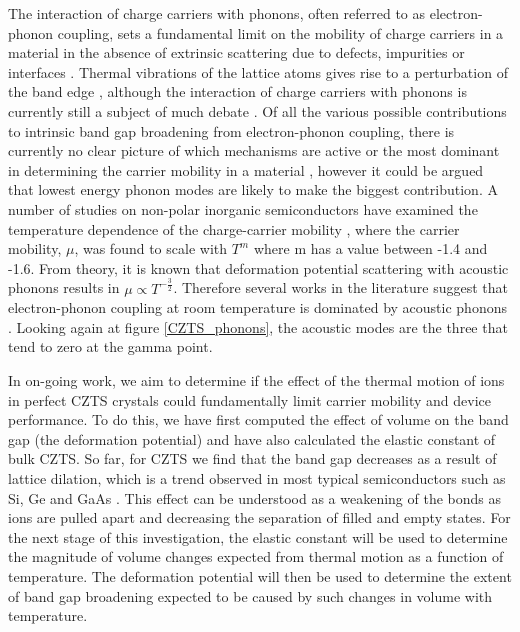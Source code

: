The interaction of charge carriers with phonons, often referred to as electron-phonon coupling, sets a fundamental limit on the mobility of charge carriers in a material in the absence of extrinsic scattering due to defects, impurities or interfaces \cite{fund_semi, MAPI_Eg_broadening}. 
Thermal vibrations of the lattice atoms gives rise to a perturbation of the band edge \cite{thin_film_Boer}, although the interaction of charge carriers with phonons is currently still a subject of much debate \cite{MAPI_Eg_broadening16, MAPI_Eg_broadening17, MAPI_Eg_broadening}.
Of all the various possible contributions to intrinsic band gap broadening from electron-phonon coupling, there is currently no clear picture of which mechanisms are active or the most dominant in determining the carrier mobility in a material \cite{MAPI_Eg_broadening}, however it could be argued that lowest energy phonon modes are likely to make the biggest contribution. A number of studies on non-polar inorganic semiconductors have examined the temperature dependence of the charge-carrier mobility \cite{MAPI_Eg_broadening21, MAPI_Eg_broadening22, MAPI_Eg_broadening23, MAPI_Eg_broadening24}, where the carrier mobility, $\mu$, was found to scale with $T^m$ where m has a value between -1.4 and -1.6. From theory, it is known that deformation potential scattering with acoustic phonons results in $\mu \propto T^{-\frac{3}{2}}$. Therefore several works in the literature suggest that electron-phonon coupling at room temperature is dominated by acoustic phonons \cite{MAPI_Eg_broadening16, MAPI_Eg_broadening17, MAPI_Eg_broadening24}. Looking again at figure \ref{CZTS_phonons}, the acoustic modes are the three that tend to zero at the gamma point.

In on-going work, we aim to determine if the effect of the thermal motion of ions in perfect CZTS crystals could fundamentally limit carrier mobility and device performance. To do this, we have first computed the effect of volume on the band gap (the deformation potential) and have also calculated the elastic constant of bulk CZTS. So far, for CZTS we find that the band gap decreases as a result of lattice dilation, which is a trend observed in most typical semiconductors such as Si, Ge and GaAs \cite{MAPI_Eg_broadening}. This effect can be understood as a weakening of the bonds as ions are pulled apart and decreasing the separation of filled and empty states. For the next stage of this investigation, the elastic constant will be used to determine the magnitude of volume changes expected from thermal motion as a function of temperature. The deformation potential will then be used to determine the extent of band gap broadening expected to be caused by such changes in volume with temperature.

